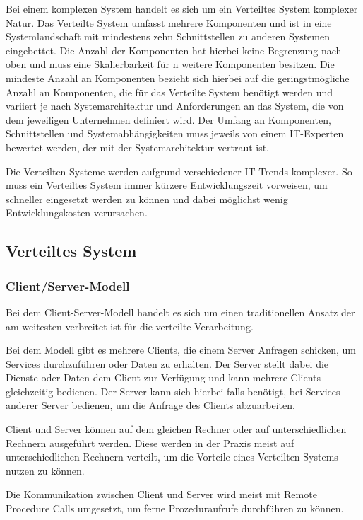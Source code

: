 Bei einem komplexen System handelt es sich um ein Verteiltes System komplexer Natur. Das Verteilte System umfasst mehrere Komponenten und ist in eine Systemlandschaft mit mindestens zehn Schnittstellen zu anderen Systemen eingebettet. Die Anzahl der Komponenten hat hierbei keine Begrenzung nach oben und muss eine Skalierbarkeit für n weitere Komponenten besitzen. Die mindeste Anzahl an Komponenten bezieht sich hierbei auf die geringstmögliche Anzahl an Komponenten, die für das Verteilte System benötigt werden und variiert je nach Systemarchitektur und Anforderungen an das System, die von dem jeweiligen Unternehmen definiert wird. Der Umfang an Komponenten, Schnittstellen und Systemabhängigkeiten muss jeweils von einem IT-Experten bewertet werden, der mit der Systemarchitektur vertraut ist. 

Die Verteilten Systeme werden aufgrund verschiedener IT-Trends komplexer. So muss ein Verteiltes System immer kürzere Entwicklungszeit vorweisen, um schneller eingesetzt werden zu können und dabei möglichst wenig Entwicklungskosten verursachen. \cite{vorossanchez:2003}

\subsection{Verteiltes System}

\subsubsection{Client/Server-Modell}
Bei dem Client-Server-Modell handelt es sich um einen traditionellen Ansatz \cite*{schill:2012} der am weitesten verbreitet ist für die verteilte Verarbeitung. \cite*{abts:2019}

Bei dem Modell gibt es mehrere Clients, die einem Server Anfragen schicken, um Services durchzuführen oder Daten zu erhalten. Der Server stellt dabei die Dienste oder Daten dem Client zur Verfügung und kann mehrere Clients gleichzeitig bedienen. \cite*{bengelbaun:2015}
Der Server kann sich hierbei falls benötigt, bei Services anderer Server bedienen, um die Anfrage des Clients abzuarbeiten. \cite{schill:2012}

Client und Server können auf dem gleichen Rechner oder auf unterschiedlichen Rechnern ausgeführt werden. \cite{bengelbaun:2015}
Diese werden in der Praxis meist auf unterschiedlichen Rechnern verteilt, um die Vorteile eines Verteilten Systems nutzen zu können. \cite{abts:2019}

Die Kommunikation zwischen Client und Server wird meist mit Remote Procedure Calls umgesetzt, um ferne Prozeduraufrufe durchführen zu können. \cite*{schill:2012}

